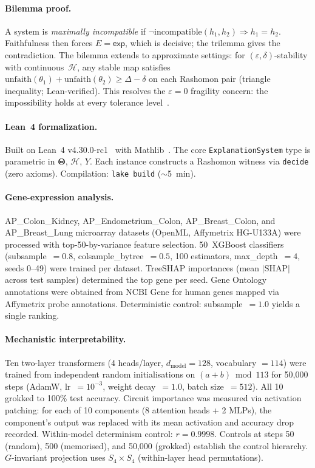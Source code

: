 \documentclass[11pt]{article}
\newcommand{\Params}{\mathbf{\Theta}}
\newcommand{\sH}{\mathcal{H}}
\begin{document}
\paragraph{Bilemma proof.}
A system is \emph{maximally incompatible} if $\lnot\mathrm{incompatible}(h_1,h_2)
\Rightarrow h_1 = h_2$.  Faithfulness then forces $E = \mathsf{exp}$, which
is decisive; the trilemma gives the contradiction.  The bilemma extends to
approximate settings: for $(\varepsilon, \delta)$-stability with
continuous~$\sH$, any stable map satisfies $\mathrm{unfaith}(\theta_1) +
\mathrm{unfaith}(\theta_2) \geq \Delta - \delta$ on each Rashomon pair
(triangle inequality; Lean-verified).  This resolves the
$\varepsilon = 0$ fragility concern: the impossibility holds at every
tolerance level~\citep{caraker2026ostrowski}.

\paragraph{Lean~4 formalization.}
Built on Lean~4 v4.30.0-rc1~\citep{demoura2021lean4} with
Mathlib~\citep{mathlib2020}.  The core \texttt{ExplanationSystem} type is
parametric in $\Params$, $\sH$, $Y$.  Each instance constructs a Rashomon
witness via \texttt{decide} (zero axioms).  Compilation: \texttt{lake
build} ($\sim$5~min).

\paragraph{Gene-expression analysis.}
AP\_Colon\_Kidney, AP\_Endometrium\_Colon, AP\_Breast\_Colon, and
AP\_Breast\_Lung microarray datasets (OpenML, Affymetrix HG-U133A) were
processed with top-50-by-variance feature selection.  50~XGBoost
classifiers (subsample~$= 0.8$, colsample\_bytree~$= 0.5$, 100
estimators, max\_depth~$= 4$, seeds 0--49) were trained per dataset.
TreeSHAP importances (mean $|\text{SHAP}|$ across test samples) determined
the top gene per seed.  Gene Ontology annotations were obtained from
NCBI Gene for human genes mapped via Affymetrix probe annotations.
Deterministic control: subsample~$= 1.0$ yields a single ranking.

\paragraph{Mechanistic interpretability.}
Ten two-layer transformers (4 heads/layer, $d_{\mathrm{model}} = 128$,
vocabulary $= 114$) were trained from independent random initialisations
on $(a + b) \bmod 113$ for 50{,}000 steps (AdamW, lr~$= 10^{-3}$, weight
decay~$= 1.0$, batch size~$= 512$).  All 10 grokked to 100\% test
accuracy.  Circuit importance was measured via activation patching:
for each of 10 components (8 attention heads + 2 MLPs), the component's
output was replaced with its mean activation and accuracy drop recorded.
Within-model determinism control: $r = 0.9998$.  Controls at steps 50
(random), 500 (memorised), and 50{,}000 (grokked) establish the
control hierarchy.  $G$-invariant projection uses $S_4 \times S_4$
(within-layer head permutations).
\end{document}
